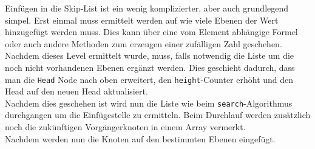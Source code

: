 \documentclass[
../../AuD-Zusammenfassung.tex,
]
{subfiles}
\begin{document}
\newpage
Einfügen in die Skip-List ist ein wenig komplizierter, aber auch grundlegend simpel. Erst einmal muss ermittelt werden auf wie viele Ebenen der Wert hinzugefügt werden muss. Dies kann über eine vom Element abhängige Formel oder auch andere Methoden zum erzeugen einer zufälligen Zahl geschehen. Nachdem dieses Level ermittelt wurde, muss, falls notwendig die Liste um die noch nicht vorhandenen Ebenen ergänzt werden. Dies geschieht dadurch, dass man die \texttt{Head} Node nach oben erweitert, den \texttt{height}-Counter erhöht und den Head auf den neuen Head aktualisiert.\\
Nachdem dies geschehen ist wird nun die Liste wie beim \texttt{search}-Algorithmus durchgangen um die Einfügestelle zu ermitteln. Beim Durchlauf werden zusätzlich noch die zukünftigen Vorgängerknoten in einem Array vermerkt.\\
Nachdem werden nun die Knoten auf den bestimmten Ebenen eingefügt.

\end{document}
